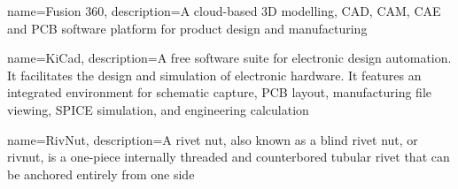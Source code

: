 {
	name=Fusion 360,
	description={A cloud-based 3D modelling, CAD, CAM, CAE and PCB software platform for product design and manufacturing}
}

{
	name=KiCad,
	description={A free software suite for electronic design automation. It facilitates the design and simulation of electronic hardware. It features an integrated environment for schematic capture, PCB layout, manufacturing file viewing, SPICE simulation, and engineering calculation}
}

{
	name=RivNut,
	description={A rivet nut, also known as a blind rivet nut, or rivnut, is a one-piece internally threaded and counterbored tubular rivet that can be anchored entirely from one side}
}




